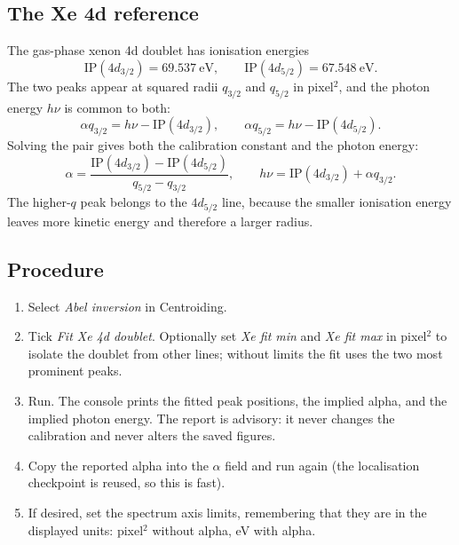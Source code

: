 \documentclass[11pt,a4paper]{article}
\newcommand{\code}[1]{\texttt{#1}}
\begin{document}
\subsection{The Xe 4d reference}

The gas-phase xenon 4d doublet has ionisation energies
\begin{equation}
  \mathrm{IP}(4d_{3/2}) = 69.537\ \mathrm{eV}, \qquad
  \mathrm{IP}(4d_{5/2}) = 67.548\ \mathrm{eV}.
\end{equation}
The two peaks appear at squared radii $q_{3/2}$ and $q_{5/2}$ in pixel$^2$,
and the photon energy $h\nu$ is common to both:
\begin{equation}
  \alpha q_{3/2} = h\nu - \mathrm{IP}(4d_{3/2}), \qquad
  \alpha q_{5/2} = h\nu - \mathrm{IP}(4d_{5/2}).
\end{equation}
Solving the pair gives both the calibration constant and the photon energy:
\begin{equation}
  \alpha = \frac{\mathrm{IP}(4d_{3/2}) - \mathrm{IP}(4d_{5/2})}{q_{5/2} - q_{3/2}},
  \qquad
  h\nu = \mathrm{IP}(4d_{3/2}) + \alpha q_{3/2}.
\end{equation}
The higher-\(q\) peak belongs to the \(4d_{5/2}\) line, because the smaller
ionisation energy leaves more kinetic energy and therefore a larger radius.

\subsection{Procedure}

\begin{enumerate}
  \item Select \emph{Abel inversion} in Centroiding.
  \item Tick \emph{Fit Xe 4d doublet}. Optionally set \emph{Xe fit min} and
        \emph{Xe fit max} in pixel$^2$ to isolate the doublet from other
        lines; without limits the fit uses the two most prominent peaks.
  \item Run. The console prints the fitted peak positions, the implied alpha,
        and the implied photon energy. The report is advisory: it never
        changes the calibration and never alters the saved figures.
  \item Copy the reported alpha into the \code{$\alpha$} field and run again
        (the localisation checkpoint is reused, so this is fast).
  \item If desired, set the spectrum axis limits, remembering that they are
        in the displayed units: pixel$^2$ without alpha, eV with alpha.
\end{enumerate}
\end{document}

